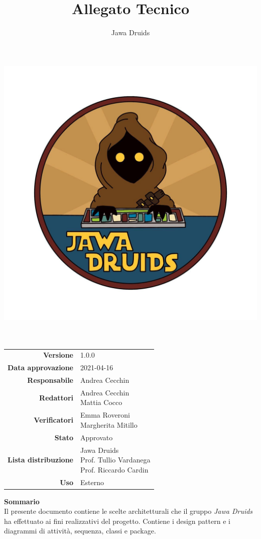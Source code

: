 


	\makeatletter
	\begin{titlepage}
		\begin{center}
			\vspace*{-4,0cm}
			\author{Jawa Druids}
			\title{Allegato Tecnico}
			\date{}
			\includegraphics[width=0.5\linewidth]{../immagini/DRUIDSLOGO.jpg}\\[4ex]

			
			{\huge \bfseries  \@title }\\[2ex] 
			{\LARGE  \@author}\\[50ex]
			\vspace*{-9,0cm}
			\begin{table}[H]
			\renewcommand{\arraystretch}{1.4}
			\centering
			\begin{tabular}{r | l}
				\textbf{Versione} & 1.0.0 \\%
				\textbf{Data approvazione} & 2021-04-16\\
				\textbf{Responsabile} & Andrea Cecchin \\
				\textbf{Redattori} & \makecell[tl]{Andrea Cecchin \\ Mattia Cocco} \\		
				\textbf{Verificatori} & \makecell[tl]{Emma Roveroni \\ Margherita Mitillo} \\
				\textbf{Stato} & Approvato\\
				\textbf{Lista distribuzione} & \makecell[tl]{Jawa Druids \\ Prof. Tullio Vardanega \\ Prof. Riccardo Cardin}\\
				\textbf{Uso} & Esterno     
			\end{tabular}
		\end{table}
		\vspace{0.1cm}
		\hfill \break
		\fontsize{17}{10}\textbf{Sommario} \\
		\vspace{0.1cm}
		Il presente documento contiene le scelte architetturali che il gruppo \emph{\normalsize{\textit{Jawa Druids}}} ha effettuato ai fini realizzativi del progetto. Contiene i design pattern e i diagrammi di attività, sequenza, classi e package.
		\end{center}
	\end{titlepage}
	\makeatother
	
	
	\tableofcontents{}
	\listoftables{}
	\listoffigures{}
	
	
	
	
